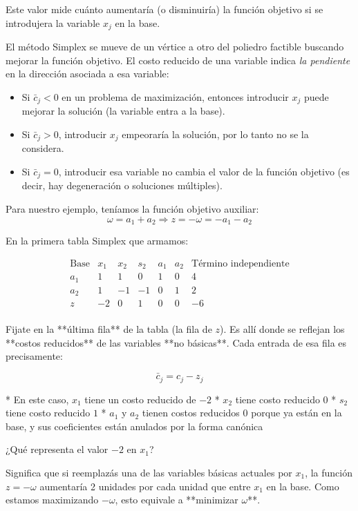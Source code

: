 Este valor mide cuánto aumentaría (o disminuiría) la función objetivo si se introdujera la variable \(x_j\) en la base.

El método Simplex se mueve de un vértice a otro del poliedro factible buscando mejorar la función objetivo. El costo reducido de una variable indica \textit{la pendiente} en la dirección asociada a esa variable:
\begin{itemize}
  \item Si \(\bar{c}_j < 0\) en un problema de maximización, entonces introducir \(x_j\) puede mejorar la solución (la variable entra a la base).
  \item Si \(\bar{c}_j > 0\), introducir \(x_j\) empeoraría la solución, por lo tanto no se la considera.
  \item Si \(\bar{c}_j = 0\), introducir esa variable no cambia el valor de la función objetivo (es decir, hay degeneración o soluciones múltiples).
\end{itemize}
Para nuestro ejemplo, teníamos la función objetivo auxiliar:
\[
\omega = a_1 + a_2
\Rightarrow z = -\omega = -a_1 - a_2
\]

En la primera tabla Simplex que armamos:

\[
\begin{array}{c|rrrrr|r}
\text{Base} & x_1 & x_2 & s_2 & a_1 & a_2 & \text{Término independiente} \\
\hline
a_1 & 1 & 1 & 0 & 1 & 0 & 4 \\
a_2 & 1 & -1 & -1 & 0 & 1 & 2 \\
\hline
z & -2 & 0 & 1 & 0 & 0 & -6 \\
\end{array}
\]

Fijate en la **última fila** de la tabla (la fila de $z$). Es allí donde se reflejan los **costos reducidos** de las variables **no básicas**. Cada entrada de esa fila es precisamente:

\[
\bar{c}_j = c_j - z_j
\]

* En este caso, $x_1$ tiene un costo reducido de $-2$
* $x_2$ tiene costo reducido 0
* $s_2$ tiene costo reducido $1$
* $a_1$ y $a_2$ tienen costos reducidos $0$ porque ya están en la base, y sus coeficientes están anulados por la forma canónica

¿Qué representa el valor $-2$ en $x_1$?

Significa que si 
reemplazás una de las variables básicas actuales por $x_1$, la función $z = -\omega$ aumentaría 2 unidades por cada unidad que entre $x_1$ en la base. Como estamos maximizando $-\omega$, esto equivale a **minimizar $\omega$**.

